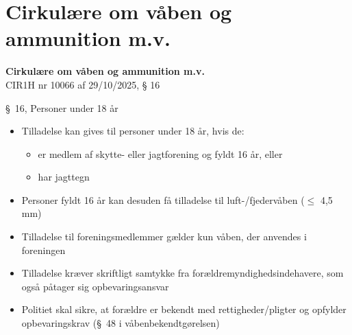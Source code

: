 \section{Cirkulære om våben og ammunition m.v.}

\begin{frame}
  \vspace{3em}
  \begin{center}
    {\LARGE \textbf{Cirkulære om våben og ammunition m.v.}} \\
    \vspace{1em}
    CIR1H nr 10066 af 29/10/2025, § 16
  \end{center}
\end{frame}

\begin{frame}{\S\ 16, Personer under 18 år}
\begin{itemize}
    \item Tilladelse kan gives til personer under 18 år, hvis de:
    \begin{itemize}
        \item er medlem af skytte- eller jagtforening og fyldt 16 år, eller
        \item har jagttegn
    \end{itemize}
    \item Personer fyldt 16 år kan desuden få tilladelse til luft-/fjedervåben ($\leq$ 4,5 mm)
    \item Tilladelse til foreningsmedlemmer gælder kun våben, der anvendes i foreningen
    \item Tilladelse kræver skriftligt samtykke fra forældremyndighedsindehavere, som også påtager sig opbevaringsansvar
    \item Politiet skal sikre, at forældre er bekendt med rettigheder/pligter og opfylder opbevaringskrav (\S\ 48 i våbenbekendtgørelsen)
\end{itemize}
\end{frame}